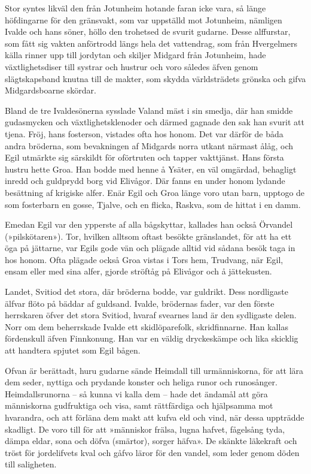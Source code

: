 Stor syntes likväl den från Jotunheim hotande faran icke vara, så länge
höfdingarne för den gränsvakt, som var uppställd mot Jotunheim, nämligen
Ivalde och hans söner, höllo den trohetsed de svurit gudarne. Desse
alffurstar, som fått sig vakten anförtrodd längs hela det vattendrag,
som från
Hvergelmers källa rinner upp till jordytan och skiljer Midgard från
Jotunheim, hade växtlighetsdiser till systrar och hustrur och voro
således äfven genom slägtskapsband knutna till de makter, som skydda
världsträdets grönska och gifva Midgardsboarne skördar.

Bland de tre Ivaldesönerna sysslade Valand mäst i sin smedja, där han
smidde gudasmycken och växtlighetsklenoder och därmed gagnade den sak
han svurit att tjena. Fröj, hans fosterson, vistades ofta hos honom. Det
var därför de båda andra bröderna, som bevakningen af Midgards norra
utkant närmast ålåg, och Egil utmärkte sig särskildt för oförtruten och
tapper vakttjänst. Hans första hustru hette Groa. Han bodde med henne å
Ysäter, en väl omgärdad, behagligt inredd och guldprydd borg vid
Elivågor. Där fanns en under honom lydande besättning af krigiske alfer.
Enär Egil och Groa länge voro utan barn, upptogo de som fosterbarn en
gosse, Tjalve, och en flicka, Raskva, som de hittat i en damm.

Emedan Egil var den ypperste af alla bågskyttar, kallades han också
Örvandel (»pilskötaren»). Tor, hvilken alltsom oftast besökte
gränslandet, för att ha ett öga på jättarne, var Egils gode vän och
plägade alltid vid sådana besök taga in hos honom. Ofta plägade också
Groa vistas i Tors hem, Trudvang, när Egil, ensam eller med sina alfer,
gjorde ströftåg på Elivågor och å jättekusten.

Landet, Svitiod det stora, där bröderna bodde, var guldrikt. Dess
nordligaste älfvar flöto på bäddar af guldsand. Ivalde, brödernas fader,
var den förste herrskaren öfver det stora Svitiod, hvaraf svearnes land
är den sydligaste delen. Norr om dem beherrskade Ivalde ett
skidlöparefolk, skridfinnarne. Han kallas fördenskull äfven Finnkonung.
Han var en väldig dryckeskämpe och lika skicklig att handtera spjutet
som Egil bågen.





Ofvan är berättadt, huru gudarne sände Heimdall till urmänniskorna, för
att lära dem seder, nyttiga och prydande konster och heliga runor och
runosånger. Heimdallsrunorna -- så kunna vi kalla dem -- hade det
ändamål att göra människorna gudfruktiga och visa, samt rättfärdiga och
hjälpsamma mot hvarandra, och att förläna dem makt att kufva eld och
vind, när dessa uppträdde skadligt. De voro till för att »människor
frälsa, lugna hafvet, fågelsång tyda, dämpa eldar, sona och döfva
(smärtor), sorger häfva». De skänkte läkekraft och tröst för
jordelifvets kval och gåfvo läror för den vandel, som leder genom döden
till saligheten.

